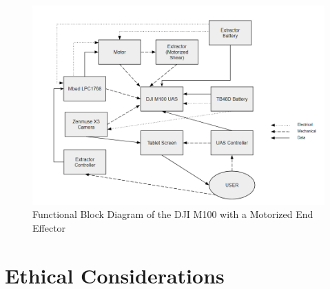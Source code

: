 \documentclass{wrcecapstone}
\begin{document}
\begin{figure}
\begin{center}
\includegraphics[width=\columnwidth]{figures/fig461.png}
\end{center}
\caption{Functional Block Diagram of the DJI M100 with a Motorized End Effector}
\label{fig:4.6.1}
\end{figure}







\section{Ethical Considerations}
\end{document}
